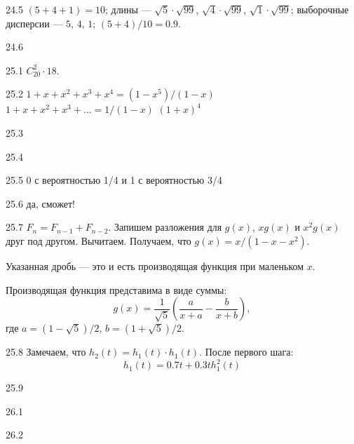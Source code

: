 \protect \hypertarget {soln:24.5}{}
\begin{solution}{{24.5}}
$(5+4+1)=10$; длины — $\sqrt{5}\cdot\sqrt{99}$, $\sqrt{4}\cdot\sqrt{99}$, $\sqrt{1}\cdot\sqrt{99}$; выборочные дисперсии — $5$, $4$, $1$; $(5+4)/10=0.9$.
\end{solution}
\protect \hypertarget {soln:24.6}{}
\begin{solution}{{24.6}}
\end{solution}
\protect \hypertarget {soln:25.1}{}
\begin{solution}{{25.1}}
$C_{20}^2\cdot 18$.
\end{solution}
\protect \hypertarget {soln:25.2}{}
\begin{solution}{{25.2}}
  $1+x+x^2+x^3+x^4=(1-x^5)/(1-x)$
  $1+x+x^2+x^3+\ldots = 1/(1-x)$
  $(1+x)^4$
\end{solution}
\protect \hypertarget {soln:25.3}{}
\begin{solution}{{25.3}}
\end{solution}
\protect \hypertarget {soln:25.4}{}
\begin{solution}{{25.4}}
\end{solution}
\protect \hypertarget {soln:25.5}{}
\begin{solution}{{25.5}}
  0 с вероятностью 1/4 и 1 с вероятностью 3/4
\end{solution}
\protect \hypertarget {soln:25.6}{}
\begin{solution}{{25.6}}
  да, сможет!
\end{solution}
\protect \hypertarget {soln:25.7}{}
\begin{solution}{{25.7}}
$F_n = F_{n-1} + F_{n-2}$.
Запишем разложения для $g(x)$, $xg(x)$ и $x^2 g(x)$ друг под другом. Вычитаем. Получаем, что $g(x) = x/(1-x-x^2)$.

Указанная дробь — это и есть производящая функция при маленьком $x$.

Производящая функция представима в виде суммы:
\[
g(x) = \frac{1}{\sqrt{5}}\left( \frac{a}{x+a} - \frac{b}{x+b}  \right),
\]
где $a=(1-\sqrt{5})/2$, $b=(1+\sqrt{5})/2$.
\end{solution}
\protect \hypertarget {soln:25.8}{}
\begin{solution}{{25.8}}
Замечаем, что $h_2(t)=h_1(t)\cdot h_1(t)$. После первого шага:
\[
h_1(t) = 0.7t + 0.3th^2_1(t)
\]
\end{solution}
\protect \hypertarget {soln:25.9}{}
\begin{solution}{{25.9}}

\end{solution}
\protect \hypertarget {soln:26.1}{}
\begin{solution}{{26.1}}
\end{solution}
\protect \hypertarget {soln:26.2}{}
\begin{solution}{{26.2}}
\end{solution}
